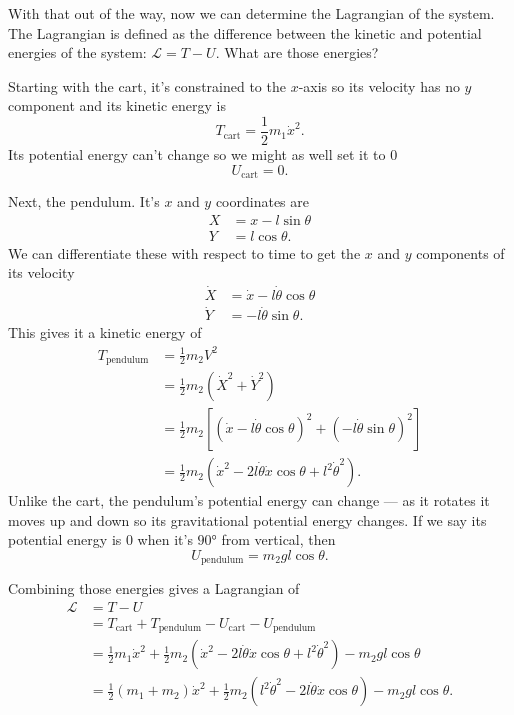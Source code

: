 \documentclass{article}
\begin{document}
With that out of the way, now we can determine the Lagrangian of the system. The Lagrangian is defined as the difference between the kinetic and potential energies of the system: $\mathcal{L} = T - U$. What are those energies?

Starting with the cart, it's constrained to the $x$-axis so its velocity has no $y$ component and its kinetic energy is \[T_\text{cart} = \frac{1}{2} m_1 \dot{x}^2.\] Its potential energy can't change so we might as well set it to $0$ \[U_\text{cart} = 0.\]

Next, the pendulum. It's $x$ and $y$ coordinates are \begin{align*}
  X & = x - l \sin \theta \\
  Y & = l \cos \theta.
\end{align*} We can differentiate these with respect to time to get the $x$ and $y$ components of its velocity \begin{align*}
  \dot{X} & = \dot{x} - l \dot{\theta} \cos \theta \\
  \dot{Y} & = -l \dot{\theta} \sin \theta.
\end{align*} This gives it a kinetic energy of \begin{align*}
  T_\text{pendulum} & = \frac{1}{2} m_2 V^2                                                                          \\
                    & = \frac{1}{2} m_2 (\dot{X}^2 + \dot{Y}^2)                                                      \\
                    & = \frac{1}{2} m_2 [(\dot{x} - l \dot{\theta} \cos \theta)^2 + (-l \dot{\theta} \sin \theta)^2] \\
                    & = \frac{1}{2} m_2 (\dot{x}^2 - 2 l \dot{\theta} \dot{x} \cos \theta + l^2 \dot{\theta}^2).
\end{align*} Unlike the cart, the pendulum's potential energy can change — as it rotates it moves up and down so its gravitational potential energy changes. If we say its potential energy is $0$ when it's $\ang{90}$ from vertical, then \[U_\text{pendulum} = m_2 g l \cos \theta.\]

Combining those energies gives a Lagrangian of \begin{align*}
  \mathcal{L} & = T - U                                                                                                                                     \\
              & = T_\text{cart} + T_\text{pendulum} - U_\text{cart} - U_\text{pendulum}                                                                     \\
              & = \frac{1}{2} m_1 \dot{x}^2 + \frac{1}{2} m_2 (\dot{x}^2 - 2 l \dot{\theta} \dot{x} \cos \theta + l^2 \dot{\theta}^2) - m_2 g l \cos \theta \\
              & = \frac{1}{2} (m_1 + m_2) \dot{x}^2 + \frac{1}{2} m_2 (l^2 \dot{\theta}^2 - 2 l \dot{\theta} \dot{x} \cos \theta) - m_2 g l \cos \theta.
\end{align*}
\end{document}
